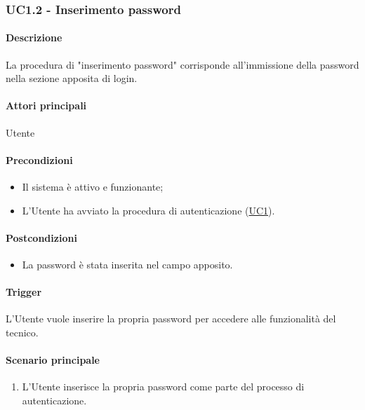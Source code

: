 
\subsubsection{UC1.2 - Inserimento password}\label{UC1point2}
\paragraph*{Descrizione}
La procedura di "inserimento password" corrisponde all'immissione della password nella sezione apposita di login.

\paragraph*{Attori principali}
Utente

\paragraph*{Precondizioni}
\begin{itemize}
  \item Il sistema è attivo e funzionante;
  \item L'Utente ha avviato la procedura di autenticazione (\hyperref[UC1]{UC1}). 
\end{itemize}

\paragraph*{Postcondizioni}
\begin{itemize}
  \item La password è stata inserita nel campo apposito.
\end{itemize}

\paragraph*{Trigger}
L'Utente vuole inserire la propria password per accedere alle funzionalità del tecnico.

\paragraph*{Scenario principale}
\begin{enumerate}
  \item L'Utente inserisce la propria password come parte del processo di autenticazione.
\end{enumerate}